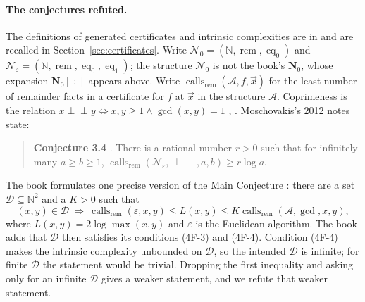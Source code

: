 \documentclass[11pt]{article}
\newcommand{\rem}{\operatorname{rem}}
\newcommand{\calls}{\operatorname{calls}}
\newcommand{\eq}{\operatorname{eq}}
\begin{document}
\paragraph{The conjectures refuted.}
The definitions of generated certificates and intrinsic complexities are in
\cite[\S\S1D, 4C--4E]{moschovakis2019} and are recalled in
Section~\ref{sec:certificates}. Write
$\mathcal N_0=(\mathbb N,\rem,\eq_0)$ and
$\mathcal N_\varepsilon=(\mathbb N,\rem,\eq_0,\eq_1)$; the structure
$\mathcal N_0$ is not the book's $\mathbf N_0$, whose expansion
$\mathbf N_0[\div]$ appears above. Write $\calls_{\rem}(\mathcal A,f,\vec x)$ for the least number of remainder facts in
a certificate for $f$ at $\vec x$ in the structure $\mathcal A$. Coprimeness is
the relation $x\perp\!\!\!\perp y\iff x,y\geq1\wedge\gcd(x,y)=1$
\cite[\S1A]{moschovakis2019}, \cite{moschovakis2012}. Moschovakis's 2012 notes
state:
\begin{quote}
\textbf{Conjecture 3.4} \cite{moschovakis2012}. There is a rational number
$r>0$ such that for infinitely many $a\geq b\geq1$,
$\calls_{\rem}(\mathcal N_\varepsilon,\perp\!\!\!\perp,a,b)\geq r\log a$.
\end{quote}
The book formulates one precise version of the Main Conjecture
\cite[p.~151]{moschovakis2019}: there are a set $\mathcal D\subseteq\mathbb N^2$
and a $K>0$ such that
\[
(x,y)\in\mathcal D\ \Longrightarrow\
\calls_{\rem}(\varepsilon,x,y)\leq L(x,y)\leq K\calls_{\rem}(\mathcal A,\gcd,x,y),
\tag{4F-5}
\]
where $L(x,y)=2\log\max(x,y)$ and $\varepsilon$ is the Euclidean algorithm.
The book adds that $\mathcal D$ then satisfies its conditions (4F-3) and
(4F-4). Condition (4F-4) makes the intrinsic complexity unbounded on
$\mathcal D$, so the intended $\mathcal D$ is infinite; for finite $\mathcal D$
the statement would be trivial. Dropping the first inequality and asking only
for an infinite $\mathcal D$ gives a weaker statement, and we refute that
weaker statement.
\end{document}
